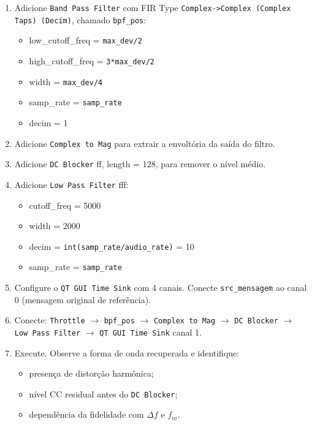 \documentclass[11pt,a4paper]{article}
\begin{document}
\begin{instrucao}
\begin{enumerate}[label=\arabic*.]
  \item Adicione \texttt{Band Pass Filter} com FIR Type
    \texttt{Complex->Complex (Complex Taps) (Decim)}, chamado \texttt{bpf\_pos}:
    \begin{itemize}
      \item low\_cutoff\_freq = \texttt{max\_dev/2}
      \item high\_cutoff\_freq = \texttt{3*max\_dev/2}
      \item width = \texttt{max\_dev/4}
      \item samp\_rate = \texttt{samp\_rate}
      \item decim = 1
    \end{itemize}
  \item Adicione \texttt{Complex to Mag} para extrair a envoltória
    da saída do filtro.
  \item Adicione \texttt{DC Blocker} ff, length = 128, para remover o
    nível médio.
  \item Adicione \texttt{Low Pass Filter} fff:
    \begin{itemize}
      \item cutoff\_freq = 5000
      \item width = 2000
      \item decim = \texttt{int(samp\_rate/audio\_rate)} = 10
      \item samp\_rate = \texttt{samp\_rate}
    \end{itemize}
  \item Configure o \texttt{QT GUI Time Sink} com 4 canais. Conecte
    \texttt{src\_mensagem} ao canal 0 (mensagem original de referência).
  \item Conecte: \texttt{Throttle} $\to$ \texttt{bpf\_pos} $\to$
    \texttt{Complex to Mag} $\to$ \texttt{DC Blocker} $\to$
    \texttt{Low Pass Filter} $\to$ \texttt{QT GUI Time Sink} canal 1.
  \item Execute. Observe a forma de onda recuperada e identifique:
    \begin{itemize}
      \item presença de distorção harmônica;
      \item nível CC residual antes do \texttt{DC Blocker};
      \item dependência da fidelidade com $\Delta f$ e $f_m$.
    \end{itemize}
\end{enumerate}
\end{instrucao}
\end{document}

